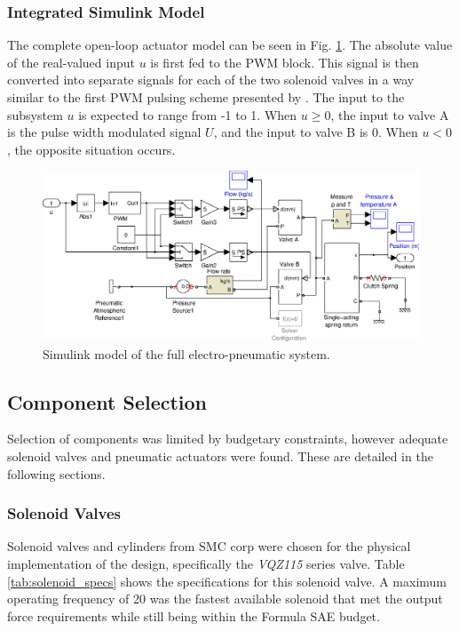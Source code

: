 \subsubsection{Integrated Simulink Model}

The complete open-loop actuator model can be seen in Fig. \ref{fig:pneumatics_model_full}. The absolute value of the real-valued input $u$ is first fed to the PWM block. This signal is then converted into separate signals for each of the two solenoid valves in a way similar to the first PWM pulsing scheme presented by \citet{accurate_position}. The input to the subsystem $u$ is expected to range from -1 to 1. When $u\geq0$, the input to valve A is the pulse width modulated signal $U$, and the input to valve B is 0. When $u<0$, the opposite situation occurs.

\begin{figure}[H]
\centering
\includegraphics[scale=0.65]{implementation/figures/pneumatic_modelling4}
\caption{Simulink model of the full electro-pneumatic system.}
\label{fig:pneumatics_model_full}
\end{figure}

\subsection{Component Selection}

Selection of components was limited by budgetary constraints, however adequate solenoid valves and pneumatic actuators were found. These are detailed in the following sections.

\subsubsection{Solenoid Valves}

Solenoid valves and cylinders from SMC corp were chosen for the physical implementation of the design, specifically the \emph{VQZ115} series valve. Table \ref{tab:solenoid_specs} shows the specifications for this solenoid valve. A maximum operating frequency of \unit{20}{\hertz} was the fastest available solenoid that met the output force requirements while still being within the Formula SAE budget.


